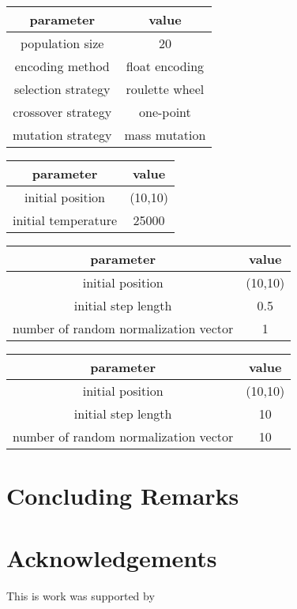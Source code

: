 \documentclass[smallextended]{svjour3}       %
\begin{document}
\begin{tabular}{cc}
	\toprule
	parameter & value \\
	\midrule
	population size      & 20               \\
    encoding method      & float encoding  \\
	selection strategy   & roulette wheel  \\
	crossover strategy   & one-point \\
	mutation strategy    & mass mutation   \\
	\bottomrule
\end{tabular}

\begin{tabular}{cc}
	\toprule
	parameter & value \\
	\midrule
    initial position & (10,10) \\
    initial temperature  &  25000 \\
	\bottomrule
\end{tabular}

\begin{tabular}{cc}
	\toprule
	parameter & value \\
	\midrule
    initial position & (10,10) \\
    initial step length &  0.5   \\
    number of random normalization vector & 1 \\
	\bottomrule
\end{tabular}



\begin{tabular}{cc}
	\toprule
	parameter & value \\
	\midrule
    initial position & (10,10) \\
    initial step length &  10   \\
    number of random normalization vector & 10 \\
	\bottomrule
\end{tabular}





\section{Concluding Remarks}
\section{Acknowledgements}
This is work was supported by 
\end{document}
